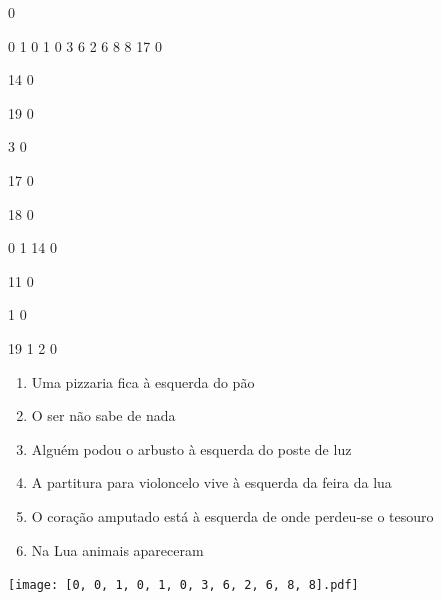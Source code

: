 \documentclass[12pt]{article}
\begin{document}
		\vfill  
		  
{
	0	%

	0	%
	1	%
	0	%
	1	%
	0	%
	3	%
	6	%
	2	%
	6	%
	8	%
	8	%
	17	%
	0	%

	14	%
	0	%

	19	%
	0	%

	3	%
	0	%

	17	%
	0	%

	18	%
	0	%

	0	%
	1	%
	14	%
	0	%

	11	%
	0	%

	1	%
	0	%

	19	%
	1	%
	2	%
	0	%

}	  
		    	

		 

\pagebreak


	\begin{enumerate}
		  \sffamily %
		  \large %


\vfill \item
Uma pizzaria fica	%
à esquerda
do pão	%

\vfill \item
O ser não	%
sabe de nada	%

\vfill \item
Alguém podou o arbusto	%
à esquerda
do poste de luz	%

\vfill \item
A partitura para violoncelo vive	%
à esquerda
da feira da lua	%

\vfill \item
O coração amputado está	%
à esquerda
de onde perdeu-se o tesouro	%

\vfill \item
Na Lua	%
animais apareceram	%
	\end{enumerate}
		  
		  \hfill

		  \vfill

\texttt{[image: [0, 0, 1, 0, 1, 0, 3, 6, 2, 6, 8, 8].pdf]}


	\hfill	  	  

\end{document}
